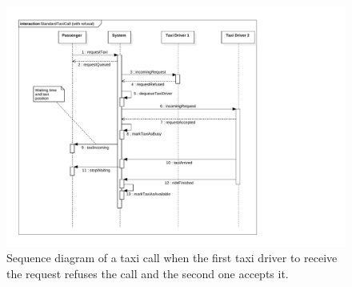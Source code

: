 \begin{figure}
\includegraphics[width=\textwidth]{diagrams/sequence_taxicall_refused.pdf}
\caption{Sequence diagram of a taxi call when the first taxi driver to receive the request refuses the call and the second one accepts it.}
\label{fig:sequence-taxicall-refused}
\end{figure}


